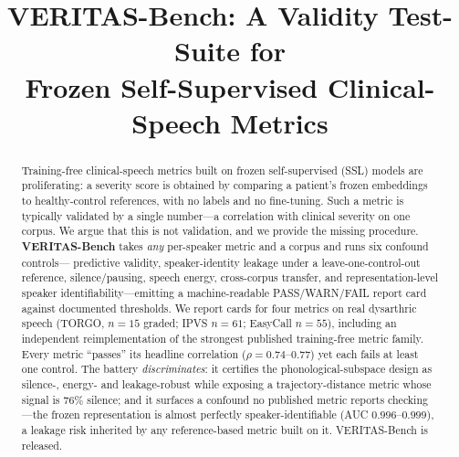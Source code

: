 \documentclass[conference]{IEEEtran}
\begin{document}
\title{VERITAS-Bench: A Validity Test-Suite for\\
Frozen Self-Supervised Clinical-Speech Metrics}

\author{
}

\maketitle

\begin{abstract}
Training-free clinical-speech metrics built on frozen self-supervised (SSL)
models are proliferating: a severity score is obtained by comparing a patient's
frozen embeddings to healthy-control references, with no labels and no
fine-tuning. Such a metric is typically validated by a single number---a
correlation with clinical severity on one corpus. We argue that this is not
validation, and we provide the missing procedure. \textbf{VERITAS-Bench} takes
\emph{any} per-speaker metric and a corpus and runs six confound controls---
predictive validity, speaker-identity leakage under a leave-one-control-out
reference, silence/pausing, speech energy, cross-corpus transfer, and
representation-level speaker identifiability---emitting a machine-readable
PASS/WARN/FAIL report card against documented thresholds. We report cards for
four metrics on real dysarthric speech (TORGO, $n{=}15$ graded; IPVS $n{=}61$;
EasyCall $n{=}55$), including an independent reimplementation of the strongest
published training-free metric family. Every metric ``passes'' its headline
correlation ($\rho{=}0.74$--$0.77$) yet each fails at least one control. The
battery \emph{discriminates}: it certifies the phonological-subspace design as
silence-, energy- and leakage-robust while exposing a trajectory-distance metric
whose signal is $76\%$ silence; and it surfaces a confound no published metric
reports checking---the frozen representation is almost perfectly
speaker-identifiable (AUC $0.996$--$0.999$), a leakage risk inherited by any
reference-based metric built on it. VERITAS-Bench is released.
\end{abstract}
\end{document}
